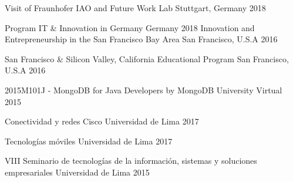 



\begin{cvhonors}

  \cvhonor
    {Visit of Fraunhofer IAO and Future Work Lab} %
    {Stuttgart, Germany} %
    {2018} %

  \cvhonor
    {Program IT \& Innovation in Germany} %
    {Germany} %
    {2018} %
  \cvhonor
    {Innovation and Entrepreneurship in the San Francisco Bay Area} %
    {San Francisco, U.S.A} %
    {2016} %

  \cvhonor
    {San Francisco \& Silicon Valley, California Educational Program} %
    {San Francisco, U.S.A} %
    {2016} %

  \cvhonor
    {2015M101J - MongoDB for Java Developers by MongoDB University}
    {Virtual}
    {2015}

\end{cvhonors}




\begin{cvhonors}

  \cvhonor
    {Conectividad y redes Cisco} %
    {Universidad de Lima} %
    {2017} %

  \cvhonor
    {Tecnologías móviles} %
    {Universidad de Lima} %
    {2017} %

  \cvhonor
    {VIII Seminario de tecnologías de la información, sistemas y soluciones empresariales} %
    {Universidad de Lima} %
    {2015} %

\end{cvhonors}
